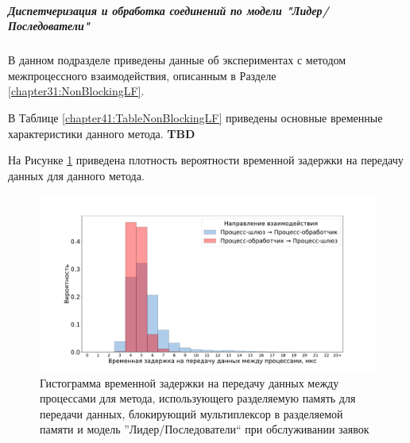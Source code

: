 \subparagraph{Диспетчеризация и обработка соединений по модели "Лидер/Последователи"}

В данном подразделе приведены данные об экспериментах с методом межпроцессного взаимодействия, описанным в Разделе \ref{chapter31:NonBlockingLF}.

В Таблице \ref{chapter41:TableNonBlockingLF} приведены основные временные характеристики данного метода. \textbf{TBD}

На Рисунке \ref{chapter41:FigNonBlockingLF} приведена плотность вероятности временной задержки на передачу данных для данного метода.

\begin{figure}[!h]
\caption{Гистограмма временной задержки на передачу данных между процессами для метода, использующего разделяемую память для передачи данных, блокирующий мультиплексор в разделяемой памяти и модель ''Лидер/Последователи`` при обслуживании заявок}
\label{chapter41:FigNonBlockingLF}
\includegraphics[width=\textwidth]{../../graphics/hist/NonBlockingLF}
\end{figure}
%

